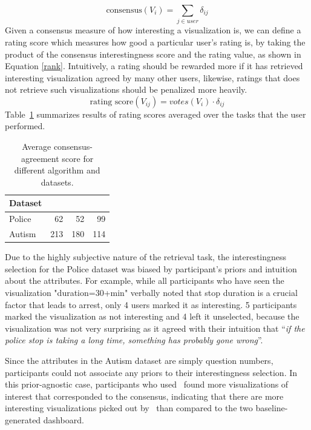 \begin{equation}\label{vote}
\textrm{consensus}(V_i) =\sum_{j\in user} \delta_{ij}
\end{equation}
Given a consensus measure of how interesting a visualization is, we can define a rating score which measures how good a particular user's rating is, by taking the product of the consensus interestingness score and the rating value, as shown in Equation \ref{rank}. Intuitively, a rating should be rewarded more if it has retrieved interesting visualization agreed by many other users, likewise, ratings that does not retrieve such visualizations should be penalized more heavily.
\begin{equation}\label{rank}
\textrm{rating score}(V_{ij}) =votes(V_i) \cdot \delta_{ij}
\end{equation}
Table~\ref{table:interesting_score} summarizes results of rating scores averaged over the tasks that the user performed.
\begin{table}[ht!]
	\centering
	\begin{tabular}{lrrr}
		\hline
		 Dataset   &   \system &   \cluster &   \BFS \\
		\hline
		 Police    &        62 &        52 &    99 \\
		 Autism    &       213 &       180 &   114 \\
		\hline
	\end{tabular}
	\caption{Average consensus-agreement score for different algorithm and datasets.}%
	\label{table:interesting_score}
\end{table}
\npar Due to the highly subjective nature of the retrieval task, the interestingness selection for the Police dataset was biased by participant's priors and intuition about the attributes. For example, while all participants who have seen the visualization "duration=30+min" verbally noted that stop duration is a crucial factor that leads to arrest, only 4 users marked it as interesting. 5 participants marked the visualization as not interesting and 4 left it unselected, because the visualization was not very surprising as it agreed with their intuition that ``\textit{if the police stop is taking a long time, something has probably gone wrong}''.
\par Since the attributes in the Autism dataset are simply question numbers, participants could not associate any priors to their interestingness selection. In this prior-agnostic case, participants who used \system\ found more visualizations of interest that corresponded to the consensus, indicating that there are more interesting visualizations picked out by \system\ than compared to the two baseline-generated dashboard.

